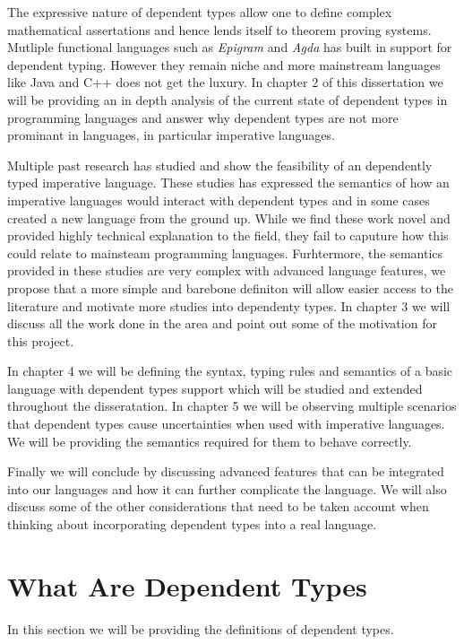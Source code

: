 \documentclass[a4paper,12pt]{report}
\begin{document}
\par
The expressive nature of dependent types allow one to define complex 
mathematical assertations and hence lends itself to theorem proving systems. 
Mutliple functional languages such as \textit{Epigram} 
\cite{epigram} and \textit{Agda} \cite{agda} has 
built in support for dependent typing. However they remain niche and more 
mainstream languages like Java and C++ does not get the luxury. In chapter 2 of 
this dissertation we will be providing an in depth analysis of the current state 
of dependent types in programming languages and answer why dependent types are 
not more prominant in languages, in particular imperative languages.

\par
Multiple past research has studied and show the feasibility of an dependently typed 
imperative language. These studies has expressed the semantics of 
how an imperative languages would interact with dependent types and in some 
cases created a new language from the ground up. While we find these work novel 
and provided highly technical explanation to the field, they fail to caputure 
how this could relate to mainsteam programming languages. Furhtermore, the 
semantics provided in these studies are very complex with advanced language 
features, we propose that a more simple and barebone definiton will allow easier 
access to the literature and motivate more studies into dependenty types. In 
chapter 3 we will discuss all the work done in the area and point out some of the 
motivation for this project.

\par
In chapter 4 we will be defining the syntax, typing rules and semantics 
of a basic language with dependent types support which will be studied 
and extended throughout the disseratation. In chapter 5 we will be observing 
multiple scenarios that dependent types cause uncertainties when used with 
imperative languages. We will be providing the semantics required for them 
to behave correctly.

\par
Finally we will conclude by discussing advanced features that can be integrated 
into our languages and how it can further complicate the language. We will also 
discuss some of the other considerations that need to be taken account when 
thinking about incorporating dependent types into a real language. 

\section{What Are Dependent Types}
In this section we will be providing the definitions of dependent types.
\end{document}
